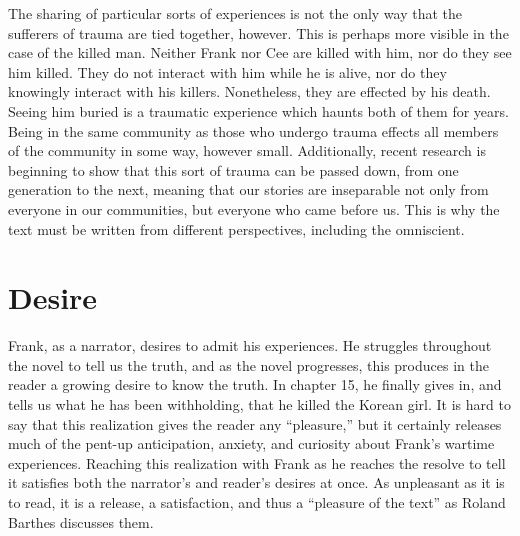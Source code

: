 \documentclass[12pt]{article}
\begin{document}
The sharing of particular sorts of experiences is not the only way that the
sufferers of trauma are tied together, however. This is perhaps more visible in
the case of the killed man. Neither Frank nor Cee are killed with him, nor do
they see him killed. They do not interact with him while he is alive, nor do
they knowingly interact with his killers. Nonetheless, they are effected by his
death. Seeing him buried is a traumatic experience which haunts both of them
for years. Being in the same community as those who undergo trauma effects all
members of the community in some way, however small. Additionally, recent
research is beginning to show that this sort of trauma can be passed down, from
one generation to the next,\autocite{Dias14,Love10} meaning that our stories
are inseparable not only from everyone in our communities, but everyone who
came before us. This is why the text must be written from different
perspectives, including the omniscient.

\section{Desire}

Frank, as a narrator, desires to admit his experiences. He struggles throughout
the novel to tell us the truth, and as the novel progresses, this produces in
the reader a growing desire to know the truth. In chapter
15,\autocite[p.~133]{Morrison12} he finally gives in, and tells us what he has
been withholding, that he killed the Korean girl. It is hard to say that this
realization gives the reader any ``pleasure,'' but it certainly releases much
of the pent-up anticipation, anxiety, and curiosity about Frank's wartime
experiences.  Reaching this realization with Frank as he reaches the resolve to
tell it satisfies both the narrator's and reader's desires at once. As
unpleasant as it is to read, it is a release, a satisfaction, and thus a
``pleasure of the text'' as Roland Barthes discusses them.\autocite[p.
124]{Charon06}
\end{document}
